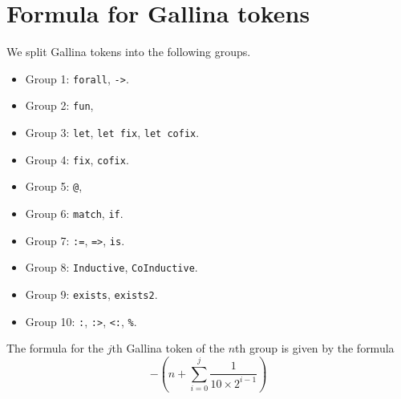 \section{Formula for Gallina tokens}\label{sec:gallinasyntax}


We split Gallina tokens into the following groups.

\begin{itemize}
 \item Group 1: \lstinline?forall?, \lstinline?->?.
 \item Group 2: \lstinline?fun?,
 \item Group 3: \lstinline?let?, \lstinline?let fix?, \lstinline?let cofix?.
 \item Group 4: \lstinline?fix?, \lstinline?cofix?.
 \item Group 5: \lstinline?@?,
 \item Group 6: \lstinline?match?, \lstinline?if?.
 \item Group 7: \lstinline?:=?, \lstinline?=>?, \lstinline?is?. 
 \item Group 8: \lstinline?Inductive?, \lstinline?CoInductive?.
 \item Group 9: \lstinline?exists?, \lstinline?exists2?.
 \item Group 10: \lstinline?:?, \lstinline?:>?, \lstinline?<:?, \lstinline?%?.
 
 
\end{itemize}



The formula for the $j$th Gallina token of the $n$th group is given by the formula $$- (n + \sum_{i=0}^j \frac{1}{10\times 2^{i-1}})$$


